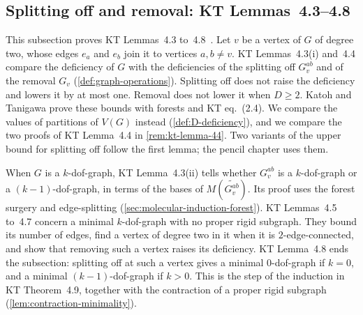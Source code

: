 \subsection{Splitting off and removal: KT Lemmas~4.3--4.8}
\label{sec:molecular-induction-dof}

This subsection proves KT Lemmas~4.3 to~4.8~\cite[pp.~661--666]{katohTanigawa2011}.
Let $v$ be a vertex of $G$ of degree two, whose edges $e_a$ and $e_b$
join it to vertices $a, b \neq v$. KT Lemmas~4.3(i) and~4.4 compare the
deficiency of $G$ with the deficiencies of the splitting off $G_v^{ab}$
and of the removal $G_v$ (\cref{def:graph-operations}). Splitting off
does not raise the deficiency and lowers it by at most one. Removal does
not lower it when $D \ge 2$. Katoh and Tanigawa prove these bounds with
forests and KT eq.~(2.4). We compare the values of partitions of $V(G)$
instead (\cref{def:D-deficiency}), and we compare the two proofs of KT
Lemma~4.4 in \cref{rem:kt-lemma-44}. Two variants of the upper bound for
splitting off follow the first lemma; the pencil chapter uses them.

When $G$ is a $k$-dof-graph, KT Lemma~4.3(ii) tells whether $G_v^{ab}$
is a $k$-dof-graph or a $(k-1)$-dof-graph, in terms of the bases of
$M(\widetilde{G_v^{ab}})$. Its proof uses the forest surgery and
edge-splitting (\cref{sec:molecular-induction-forest}). KT Lemmas~4.5
to~4.7 concern a minimal $k$-dof-graph with no proper rigid subgraph.
They bound its number of edges, find a vertex of degree two in it when
it is $2$-edge-connected, and show that removing such a vertex raises
its deficiency. KT Lemma~4.8 ends the subsection: splitting off at such
a vertex gives a minimal $0$-dof-graph if $k = 0$, and a minimal
$(k-1)$-dof-graph if $k > 0$. This is the step of the induction in KT
Theorem~4.9, together with the contraction of a proper rigid subgraph
(\cref{lem:contraction-minimality}).

